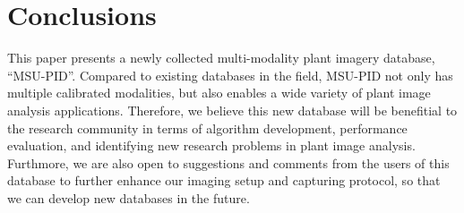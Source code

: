 \section{Conclusions}

This paper presents a newly collected multi-modality plant imagery database, ``MSU-PID''.
Compared to existing databases in the field, MSU-PID not only has multiple calibrated modalities, but also enables a wide variety of plant image analysis applications.
Therefore, we believe this new database will be benefitial to the research community in terms of algorithm development, performance evaluation, and identifying new research problems in plant image analysis.
Furthmore, we are also open to suggestions and comments from the users of this database to further enhance our imaging setup and capturing protocol, so that we can develop new databases in the future. 
